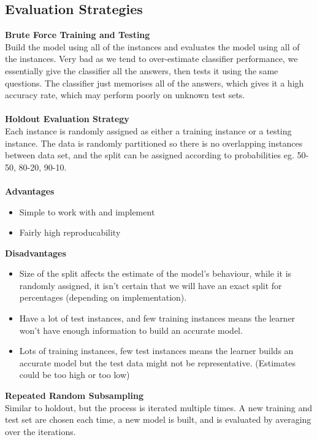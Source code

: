 \documentclass[a4paper,10pt]{article}
\begin{document}
\subsection*{Evaluation Strategies}
\textcolor{Periwinkle}{\textbf{Brute Force Training and Testing}}\\
Build the model using all of the instances and evaluates the model using all of the instances. Very bad as we tend to over-estimate classifier performance, we essentially give the classifier all the answers, then tests it using the same questions. The classifier just memorises all of the answers, which gives it a high accuracy rate, which may perform poorly on unknown test sets. \\\\
\textcolor{Periwinkle}{\textbf{Holdout Evaluation Strategy}}\\
Each instance is randomly assigned as either a training instance or a testing instance. The data is randomly partitioned so there is no overlapping instances between data set, and the split can be assigned according to probabilities eg. 50-50, 80-20, 90-10. \\\\
\textbf{Advantages}
\begin{itemize}
	\item Simple to work with and implement 
	\item Fairly high reproducability 
\end{itemize} 
\textbf{Disadvantages}
\begin{itemize}
	\item Size of the split affects the estimate of the model's behaviour, while it is randomly assigned, it isn't certain that we will have an exact split for percentages (depending on implementation). 
	\item Have a lot of test instances, and few training instances means the learner won't have enough information to build an accurate model. 
	\item Lots of training instances, few test instances means the learner builds an accurate model but the test data might not be representative. (Estimates could be too high or too low)
\end{itemize}
\textcolor{Periwinkle}{\textbf{Repeated Random Subsampling}}\\
Similar to holdout, but the process is iterated multiple times. A new training and test set are chosen each time, a new model is built, and is evaluated by averaging over the iterations. \\\\
\end{document}
